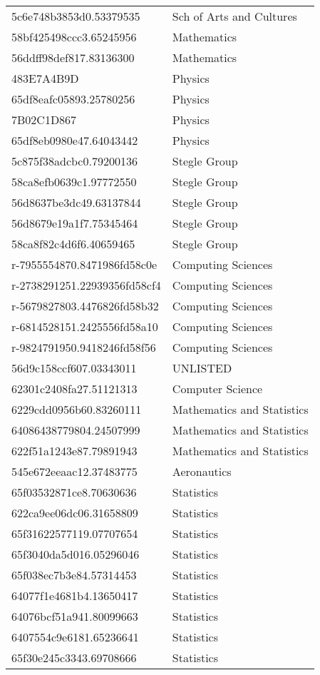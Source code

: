 \begin{tabular}{ll}
5c6e748b3853d0.53379535 & Sch of Arts and Cultures \\
58bf425498ccc3.65245956 & Mathematics \\
56ddff98def817.83136300 & Mathematics \\
483E7A4B9D & Physics \\
65df8eafc05893.25780256 & Physics \\
7B02C1D867 & Physics \\
65df8eb0980e47.64043442 & Physics \\
5c875f38adcbc0.79200136 & Stegle Group \\
58ca8efb0639c1.97772550 & Stegle Group \\
56d8637be3dc49.63137844 & Stegle Group \\
56d8679e19a1f7.75345464 & Stegle Group \\
58ca8f82c4d6f6.40659465 & Stegle Group \\
r-7955554870.8471986fd58c0e & Computing Sciences \\
r-2738291251.22939356fd58cf4 & Computing Sciences \\
r-5679827803.4476826fd58b32 & Computing Sciences \\
r-6814528151.2425556fd58a10 & Computing Sciences \\
r-9824791950.9418246fd58f56 & Computing Sciences \\
56d9c158ccf607.03343011 & UNLISTED \\
62301c2408fa27.51121313 & Computer Science \\
6229cdd0956b60.83260111 & Mathematics and Statistics \\
64086438779804.24507999 & Mathematics and Statistics \\
622f51a1243e87.79891943 & Mathematics and Statistics \\
545e672eeaac12.37483775 & Aeronautics \\
65f03532871ce8.70630636 & Statistics \\
622ca9ee06dc06.31658809 & Statistics \\
65f31622577119.07707654 & Statistics \\
65f3040da5d016.05296046 & Statistics \\
65f038ec7b3e84.57314453 & Statistics \\
64077f1e4681b4.13650417 & Statistics \\
64076bcf51a941.80099663 & Statistics \\
6407554c9e6181.65236641 & Statistics \\
65f30e245c3343.69708666 & Statistics \\

\end{tabular}
